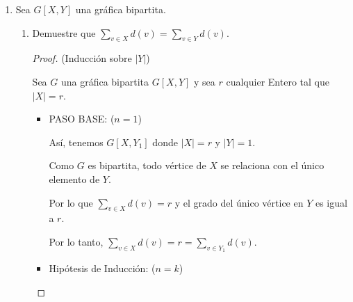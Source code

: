\documentclass{article}
\begin{document}
\begin{enumerate}
\begin{enumerate}
\begin{proof}
      Ahora notemos que, en $Y$ est\'an todos los subconjuntos de
      $BL_n$  que tienen cardinalidad impar.
      
      Por lo tanto, la diferencia sim\'etrica en cualesquiera dos subconjuntos
      distintos en $Y$ es:

      \begin{itemize}
      \item[-] Al menos un conjunto de cardinalidad $2$.
      \end{itemize}

      Entonces tenemos que: $2k + 1 - (2k -1) = 2$ y como $Y$
      es un conjunto, no se tiene dos conjuntos iguales a los
      cuales relacionar.
      
      Por lo anterior y por la definici\'on de diferencia sim\'etrica, no existen dos conjuntos adyacentes en $Y$.

      \hspace*{3cm}  $\therefore$ \ \ \ $BL_n$ es bipartita en $X$ y $Y$, \textit{i.e.} $BL_n[X,Y]$
    \end{proof}
  \end{enumerate}

\item Sea $G[X, Y]$ una gr\'afica bipartita.
  \begin{enumerate}

  \item Demuestre que $\sum_{v \in X} d(v) = \sum_{v \in Y} d(v)$.
    \begin{proof}
      (Inducción sobre ${|Y|}$)

      Sea $G$ una gr\'afica bipartita $G[X,Y]$ y sea $r$ cualquier Entero tal que $|X|=r$.
      \begin{itemize}
      \item PASO BASE: ($n=1$)

        As\'i, tenemos $G[X,Y_{1}]$ donde $|X|=r$ y $|Y|=1$.
        
        Como $G$ es bipartita, todo v\'ertice de $X$ se relaciona con el \'unico elemento
        de $Y$. 
        
        Por lo que $\sum_{v \in X}d(v) = r$ y el grado del \'unico v\'ertice
        en $Y$ es igual a $r$.
        
        Por lo tanto, $\sum_{v \in X}d(v) = r = \sum_{v \in Y_1}d(v)$.

      \item Hip\'otesis de Inducci\'on: ($n=k$)


\end{itemize}
\end{proof}
\end{enumerate}
\end{enumerate}
\end{document}
